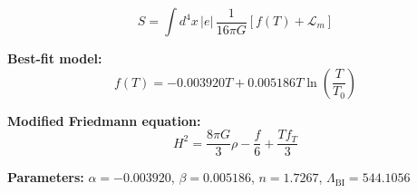 
\begin{equation}
  S = \int d^4x \, |e| \, \frac{1}{16\pi G} \left[ f(T) + \mathcal{L}_m \right]
\end{equation}

\textbf{Best-fit model:}
\begin{equation}
  f(T) = -0.003920 T + 0.005186 T \ln\!\left(\frac{T}{T_0}\right)
\end{equation}

\textbf{Modified Friedmann equation:}
\begin{equation}
  H^2 = \frac{8\pi G}{3} \rho - \frac{f}{6} + \frac{T f_T}{3}
\end{equation}

\textbf{Parameters:}
$\alpha = -0.003920$, \quad
$\beta = 0.005186$, \quad
$n = 1.7267$, \quad
$\Lambda_{\text{BI}} = 544.1056$